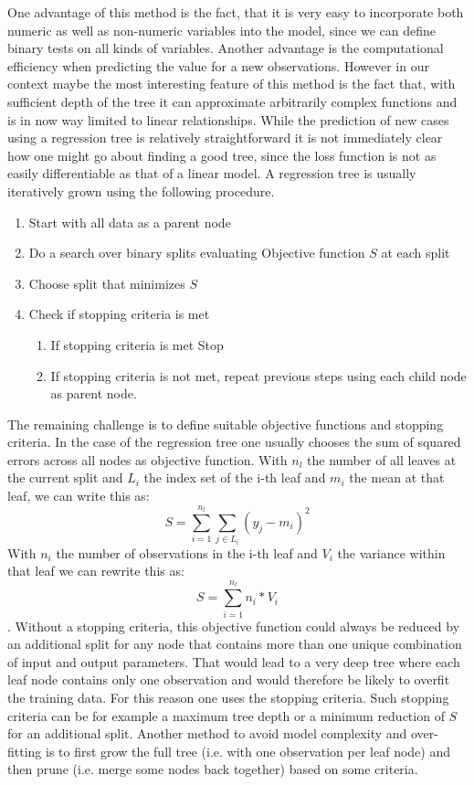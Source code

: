One advantage of this method is the fact, that it is very easy to incorporate both numeric as well as non-numeric variables into the model, since we can define binary tests on all kinds of variables. Another advantage is the computational efficiency when predicting the value for a new observations. However in our context maybe the most interesting feature of this method is the fact that, with sufficient depth of the tree it can approximate arbitrarily complex functions and is in now way limited to linear relationships. While the prediction of new cases using a regression tree is relatively straightforward it is not immediately clear how one might go about finding a good tree, since the loss function is not as easily differentiable as that of a linear model. A regression tree is usually iteratively grown using the following procedure.
\begin{enumerate}
\item Start with all data as a parent node
\item Do a search over binary splits evaluating Objective function $S$ at each split
\item Choose split that minimizes $S$
\item Check if stopping criteria is met
\begin{enumerate}
	\item If stopping criteria is met Stop
	\item If stopping criteria is not met, repeat previous steps using each child node as parent node.
\end{enumerate}
\end{enumerate}
The remaining challenge is to define suitable objective functions and stopping criteria. In the case of the regression tree one usually chooses the sum of squared errors across all nodes as objective function. With $n_l$ the number of all leaves at the current split and $L_i$ the index set of the i-th leaf and $m_i$ the mean at that leaf, we can write this as:
$$S = \sum_{i = 1}^{n_l} \sum_{j \in L_i} (y_j - m_i)^2$$
With $n_i$ the number of observations in the i-th leaf and $V_i$ the variance within that leaf we can rewrite this as:
$$S = \sum_{i = 1}^{n_l}n_i * V_i$$.
Without a stopping criteria, this objective function could always be reduced by an additional split for any node that contains more than one unique combination of input and output parameters. That would lead to a very deep tree where each leaf node contains only one observation and would therefore be likely to overfit the training data. For this reason one uses the stopping criteria. Such stopping criteria can be for example a maximum tree depth or a minimum reduction of $S$ for an additional split. Another method to avoid model complexity and over-fitting is to first grow the full tree (i.e. with one observation per leaf node) and then prune (i.e. merge some nodes back together) based on some criteria.
